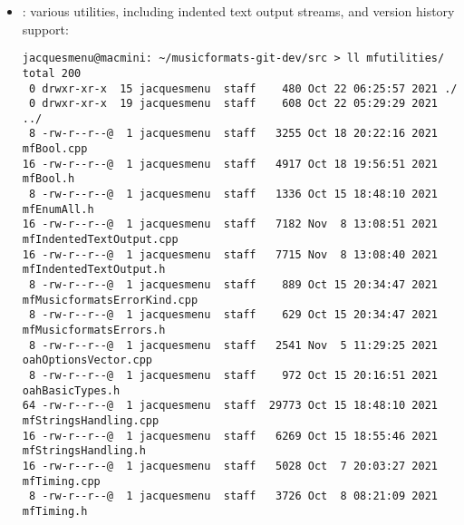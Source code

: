 \begin{itemize}
\item {} : various utilities, including indented text output streams, and version history support:%
\begin{lstlisting}[language=Terminal]
jacquesmenu@macmini: ~/musicformats-git-dev/src > ll mfutilities/
total 200
 0 drwxr-xr-x  15 jacquesmenu  staff    480 Oct 22 06:25:57 2021 ./
 0 drwxr-xr-x  19 jacquesmenu  staff    608 Oct 22 05:29:29 2021 ../
 8 -rw-r--r--@  1 jacquesmenu  staff   3255 Oct 18 20:22:16 2021 mfBool.cpp
16 -rw-r--r--@  1 jacquesmenu  staff   4917 Oct 18 19:56:51 2021 mfBool.h
 8 -rw-r--r--@  1 jacquesmenu  staff   1336 Oct 15 18:48:10 2021 mfEnumAll.h
16 -rw-r--r--@  1 jacquesmenu  staff   7182 Nov  8 13:08:51 2021 mfIndentedTextOutput.cpp
16 -rw-r--r--@  1 jacquesmenu  staff   7715 Nov  8 13:08:40 2021 mfIndentedTextOutput.h
 8 -rw-r--r--@  1 jacquesmenu  staff    889 Oct 15 20:34:47 2021 mfMusicformatsErrorKind.cpp
 8 -rw-r--r--@  1 jacquesmenu  staff    629 Oct 15 20:34:47 2021 mfMusicformatsErrors.h
 8 -rw-r--r--@  1 jacquesmenu  staff   2541 Nov  5 11:29:25 2021 oahOptionsVector.cpp
 8 -rw-r--r--@  1 jacquesmenu  staff    972 Oct 15 20:16:51 2021 oahBasicTypes.h
64 -rw-r--r--@  1 jacquesmenu  staff  29773 Oct 15 18:48:10 2021 mfStringsHandling.cpp
16 -rw-r--r--@  1 jacquesmenu  staff   6269 Oct 15 18:55:46 2021 mfStringsHandling.h
16 -rw-r--r--@  1 jacquesmenu  staff   5028 Oct  7 20:03:27 2021 mfTiming.cpp
 8 -rw-r--r--@  1 jacquesmenu  staff   3726 Oct  8 08:21:09 2021 mfTiming.h
\end{lstlisting}


\end{itemize}

